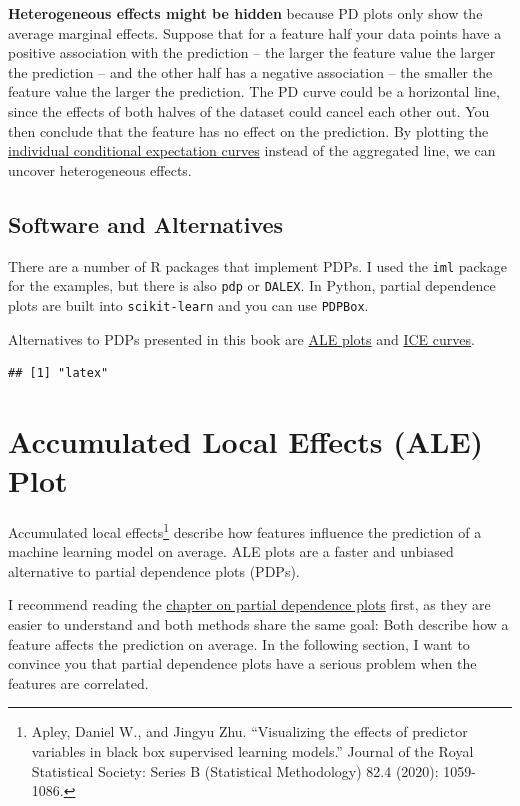 \documentclass[
  11pt,
]{scrbook}
\begin{document}
\textbf{Heterogeneous effects might be hidden} because PD plots only show the average marginal effects.
Suppose that for a feature half your data points have a positive association with the prediction -- the larger the feature value the larger the prediction -- and the other half has a negative association -- the smaller the feature value the larger the prediction.
The PD curve could be a horizontal line, since the effects of both halves of the dataset could cancel each other out.
You then conclude that the feature has no effect on the prediction.
By plotting the \protect\hyperlink{ice}{individual conditional expectation curves} instead of the aggregated line, we can uncover heterogeneous effects.

\hypertarget{software-and-alternatives-1}{%
\subsection{Software and Alternatives}\label{software-and-alternatives-1}}

There are a number of R packages that implement PDPs.
I used the \texttt{iml} package for the examples, but there is also \texttt{pdp} or \texttt{DALEX}.
In Python, partial dependence plots are built into \texttt{scikit-learn} and you can use \texttt{PDPBox}.

Alternatives to PDPs presented in this book are \protect\hyperlink{ale}{ALE plots} and \protect\hyperlink{ice}{ICE curves}.

\begin{verbatim}
## [1] "latex"
\end{verbatim}

\newpage

\hypertarget{ale}{%
\section{Accumulated Local Effects (ALE) Plot}\label{ale}}

Accumulated local effects\footnote{Apley, Daniel W., and Jingyu Zhu. ``Visualizing the effects of predictor variables in black box supervised learning models.'' Journal of the Royal Statistical Society: Series B (Statistical Methodology) 82.4 (2020): 1059-1086.} describe how features influence the prediction of a machine learning model on average.
ALE plots are a faster and unbiased alternative to partial dependence plots (PDPs).

I recommend reading the \protect\hyperlink{pdp}{chapter on partial dependence plots} first, as they are easier to understand and both methods share the same goal:
Both describe how a feature affects the prediction on average.
In the following section, I want to convince you that partial dependence plots have a serious problem when the features are correlated.
\end{document}
